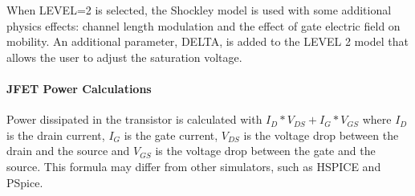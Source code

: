 When LEVEL=2 is selected, the Shockley model is used with some additional physics
effects:  channel length modulation and the effect of gate electric field on
mobility.  An additional parameter, DELTA, is added to the LEVEL 2 model that
allows the user to adjust the saturation voltage.

\paragraph{JFET Power Calculations}
Power dissipated in the transistor is calculated with $I_{D}*V_{DS}+I_{G}*V_{GS}$ where
$I_{D}$ is the drain current, $I_{G}$ is the gate current, $V_{DS}$ is the 
voltage drop between the drain and the source and $V_{GS}$ is the voltage drop 
between the gate and the source. This formula may differ from other simulators,
such as HSPICE and PSpice.
